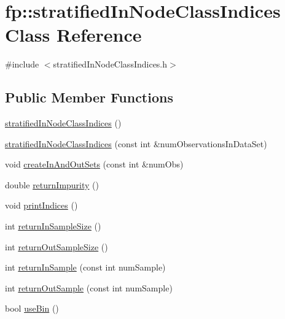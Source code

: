 \hypertarget{classfp_1_1stratifiedInNodeClassIndices}{}\section{fp\+:\+:stratified\+In\+Node\+Class\+Indices Class Reference}
\label{classfp_1_1stratifiedInNodeClassIndices}


{\ttfamily \#include $<$stratified\+In\+Node\+Class\+Indices.\+h$>$}

\subsection*{Public Member Functions}
\begin{DoxyCompactItemize}
\item 
\hyperlink{classfp_1_1stratifiedInNodeClassIndices_a41dd9148191e93d4cae66ddac33a4248}{stratified\+In\+Node\+Class\+Indices} ()
\item 
\hyperlink{classfp_1_1stratifiedInNodeClassIndices_acceb2fa1061c82ec37da7674784bc8b8}{stratified\+In\+Node\+Class\+Indices} (const int \&num\+Observations\+In\+Data\+Set)
\item 
void \hyperlink{classfp_1_1stratifiedInNodeClassIndices_a64bc290a78f3800cef41d42ebe64ff1b}{create\+In\+And\+Out\+Sets} (const int \&num\+Obs)
\item 
double \hyperlink{classfp_1_1stratifiedInNodeClassIndices_a044392c507fe54073f55f5ae6aceac5f}{return\+Impurity} ()
\item 
void \hyperlink{classfp_1_1stratifiedInNodeClassIndices_ad6fa9fff888ee939d4681dc065b71815}{print\+Indices} ()
\item 
int \hyperlink{classfp_1_1stratifiedInNodeClassIndices_a596235ffec7250fabd2818d395b39c66}{return\+In\+Sample\+Size} ()
\item 
int \hyperlink{classfp_1_1stratifiedInNodeClassIndices_a6630b77af340d2023d88bafa87b94cae}{return\+Out\+Sample\+Size} ()
\item 
int \hyperlink{classfp_1_1stratifiedInNodeClassIndices_a2d7e802fb97db0367bb8e8f31d393afd}{return\+In\+Sample} (const int num\+Sample)
\item 
int \hyperlink{classfp_1_1stratifiedInNodeClassIndices_aa872890a8499e449129796cf6bb9af04}{return\+Out\+Sample} (const int num\+Sample)
\item 
bool \hyperlink{classfp_1_1stratifiedInNodeClassIndices_af740a8054cefe977f8f1288fc6b39109}{use\+Bin} ()
\item 

\end{DoxyCompactItemize}
